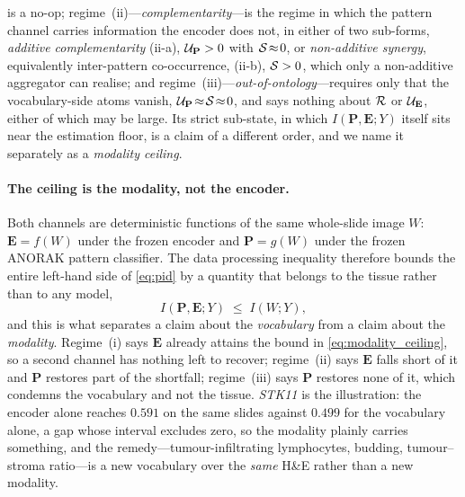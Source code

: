 is a no-op; regime~(ii)---\emph{complementarity}---is the
regime in which the pattern channel carries information the encoder
does not, in either of two sub-forms, \emph{additive
complementarity} (ii-a), $\mathcal{U}_{\mathbf{P}}>0$ with
$\mathcal{S}\!\approx\!0$, or \emph{non-additive synergy}, equivalently
inter-pattern co-occurrence, (ii-b), $\mathcal{S}>0$, which only a
non-additive aggregator can realise;
and regime~(iii)---\emph{out-of-ontology}---requires only that the
vocabulary-side atoms vanish,
$\mathcal{U}_{\mathbf{P}}\!\approx\!\mathcal{S}\!\approx\!0$, and says nothing about
$\mathcal{R}$ or $\mathcal{U}_{\mathbf{E}}$, either of which may be large. Its strict
sub-state, in which $I(\mathbf{P},\mathbf{E};Y)$ itself sits near the
estimation floor, is a claim of a different order, and we name it
separately as a \emph{modality ceiling}.

\paragraph{The ceiling is the modality, not the encoder.}
Both channels are deterministic functions of the same whole-slide image
$W$: $\mathbf{E}=f(W)$ under the frozen \ctranspath{} encoder and
$\mathbf{P}=g(W)$ under the frozen ANORAK pattern classifier. The data
processing inequality\cite{cover2006elements} therefore bounds the
entire left-hand side of \cref{eq:pid} by a quantity that belongs to the
tissue rather than to any model,
\begin{equation}
I\!\left(\mathbf{P},\mathbf{E};Y\right) \;\leq\; I\!\left(W;Y\right),
\label{eq:modality_ceiling}
\end{equation}
and this is what separates a claim about the \emph{vocabulary} from a
claim about the \emph{modality}. Regime~(i) says $\mathbf{E}$
already attains the bound in \cref{eq:modality_ceiling}, so a second
channel has nothing left to recover; regime~(ii) says $\mathbf{E}$ falls
short of it and $\mathbf{P}$ restores part of the shortfall;
regime~(iii) says $\mathbf{P}$ restores none of it, which condemns the
vocabulary and not the tissue. \textit{STK11} is the illustration: the
encoder alone reaches $0.591$ on the same slides against $0.499$ for the
vocabulary alone, a gap whose interval excludes zero, so the modality
plainly carries something, and the remedy---tumour-infiltrating
lymphocytes, budding, tumour--stroma ratio---is a new vocabulary over
the \emph{same} H\&E rather than a new modality.

